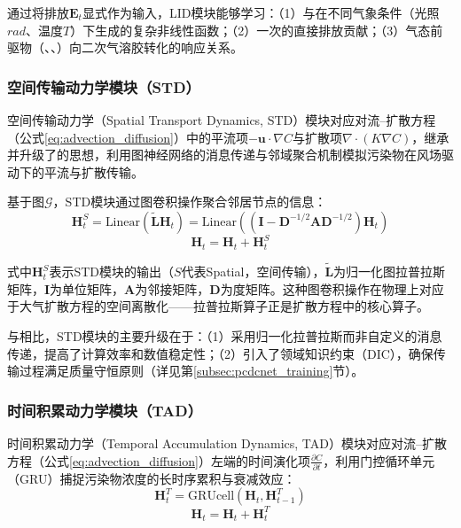 通过将排放$\mathbf{E}_t$显式作为输入，LID模块能够学习：（1）\NOx 与\VOCs{}在不同气象条件（光照$rad$、温度$T$）下生成\ozone 的复杂非线性函数；（2）一次\PM 的直接排放贡献；（3）气态前驱物（\SOtwo、\NOx、\NHthree）向二次气溶胶转化的响应关系。


\subsubsection{空间传输动力学模块（STD）}
空间传输动力学（Spatial Transport Dynamics, STD）模块对应对流--扩散方程（公式\eqref{eq:advection_diffusion}）中的平流项$-\mathbf{u} \cdot \nabla C$与扩散项$\nabla \cdot (K\nabla C)$，继承并升级了\ModelPred{}的思想，利用图神经网络的消息传递与邻域聚合机制模拟污染物在风场驱动下的平流与扩散传输。

基于图$\mathcal{G}$，STD模块通过图卷积操作聚合邻居节点的信息：
\begin{equation}
    \mathbf{H}_t^S = \text{Linear}\left(\tilde{\mathbf{L}}\mathbf{H}_t\right) = \text{Linear}\left((\mathbf{I} - \mathbf{D}^{-1/2}\mathbf{A}\mathbf{D}^{-1/2})\mathbf{H}_t\right)
\label{eq:std_gcn}
\end{equation}
\begin{equation}
    \mathbf{H}_t = \mathbf{H}_t + \mathbf{H}_t^S
\end{equation}

\noindent 式中$\mathbf{H}_t^S$表示STD模块的输出（$S$代表Spatial，空间传输），$\tilde{\mathbf{L}}$为归一化图拉普拉斯矩阵，$\mathbf{I}$为单位矩阵，$\mathbf{A}$为邻接矩阵，$\mathbf{D}$为度矩阵。这种图卷积操作在物理上对应于大气扩散方程的空间离散化\citep{kipf2017semi,li2023improving}——拉普拉斯算子正是扩散方程中的核心算子。

与\ModelPred{}相比，STD模块的主要升级在于：（1）采用归一化拉普拉斯而非自定义的消息传递，提高了计算效率和数值稳定性；（2）引入了领域知识约束（DIC），确保传输过程满足质量守恒原则（详见第\ref{subsec:pcdcnet_training}节）。


\subsubsection{时间积累动力学模块（TAD）}
时间积累动力学（Temporal Accumulation Dynamics, TAD）模块对应对流--扩散方程（公式\eqref{eq:advection_diffusion}）左端的时间演化项$\frac{\partial C}{\partial t}$，利用门控循环单元（GRU）捕捉污染物浓度的长时序累积与衰减效应：
\begin{equation}
    \mathbf{H}_t^T = \text{GRUcell}(\mathbf{H}_t, \mathbf{H}_{t-1}^T)
\end{equation}
\begin{equation}
    \mathbf{H}_t = \mathbf{H}_t + \mathbf{H}_t^T
\end{equation}


